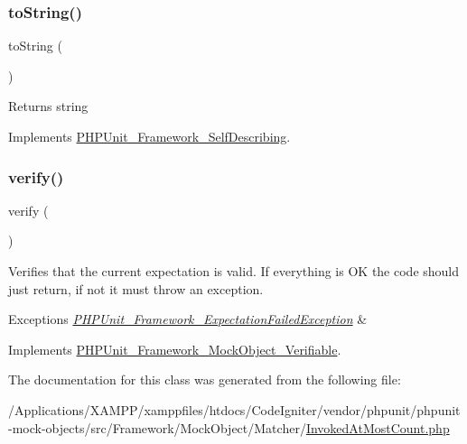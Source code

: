 \subsubsection{\texorpdfstring{to\+String()}{toString()}}
{\footnotesize\ttfamily to\+String (\begin{DoxyParamCaption}{ }\end{DoxyParamCaption})}

\begin{DoxyReturn}{Returns}
string 
\end{DoxyReturn}


Implements \mbox{\hyperlink{interface_p_h_p_unit___framework___self_describing_a5558c5d549f41597377fa1ea8a1cefa3}{P\+H\+P\+Unit\+\_\+\+Framework\+\_\+\+Self\+Describing}}.

\mbox{\label{class_p_h_p_unit___framework___mock_object___matcher___invoked_at_most_count_aa33600b6a1b28d0c4dfe4d468272aaa4}} 
\subsubsection{\texorpdfstring{verify()}{verify()}}
{\footnotesize\ttfamily verify (\begin{DoxyParamCaption}{ }\end{DoxyParamCaption})}

Verifies that the current expectation is valid. If everything is OK the code should just return, if not it must throw an exception.


\begin{DoxyExceptions}{Exceptions}
{\em \mbox{\hyperlink{class_p_h_p_unit___framework___expectation_failed_exception}{P\+H\+P\+Unit\+\_\+\+Framework\+\_\+\+Expectation\+Failed\+Exception}}} & \\
\hline
\end{DoxyExceptions}


Implements \mbox{\hyperlink{interface_p_h_p_unit___framework___mock_object___verifiable_aa33600b6a1b28d0c4dfe4d468272aaa4}{P\+H\+P\+Unit\+\_\+\+Framework\+\_\+\+Mock\+Object\+\_\+\+Verifiable}}.



The documentation for this class was generated from the following file\+:\begin{DoxyCompactItemize}
\item 
/\+Applications/\+X\+A\+M\+P\+P/xamppfiles/htdocs/\+Code\+Igniter/vendor/phpunit/phpunit-\/mock-\/objects/src/\+Framework/\+Mock\+Object/\+Matcher/\mbox{\hyperlink{_invoked_at_most_count_8php}{Invoked\+At\+Most\+Count.\+php}}\end{DoxyCompactItemize}
